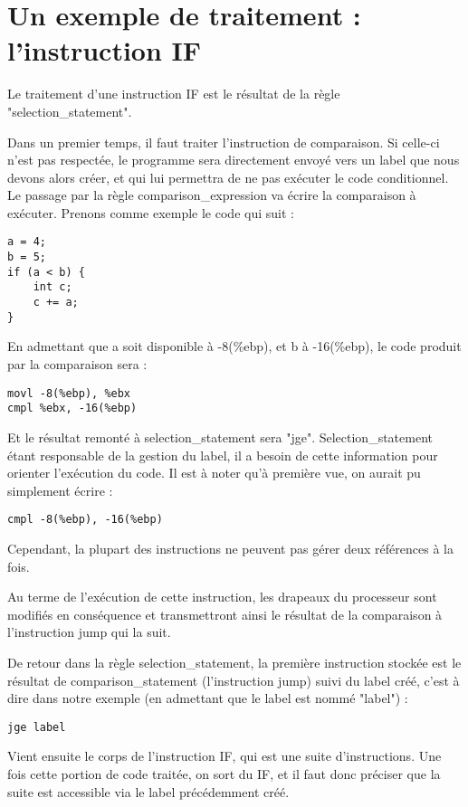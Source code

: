 \section{Un exemple de traitement : l'instruction IF} 

Le traitement d'une instruction IF est le résultat de la règle "selection\_statement".

Dans un premier temps, il faut traiter l'instruction de comparaison. Si celle-ci n'est pas respectée, le programme sera directement envoyé vers un label que nous devons alors créer, et qui lui permettra de ne pas exécuter le code conditionnel.
Le passage par la règle comparison\_expression va écrire la comparaison à exécuter.
Prenons comme exemple le code qui suit :
\begin{verbatim}
a = 4;
b = 5;
if (a < b) {
	int c;
	c += a;
}
\end{verbatim}

En admettant que a soit disponible à -8(\%ebp), et b à -16(\%ebp), le code produit par la comparaison sera :

\begin{verbatim}
movl -8(%ebp), %ebx
cmpl %ebx, -16(%ebp)
\end{verbatim}

Et le résultat remonté à selection\_statement sera "jge". 
Selection\_statement étant responsable de la gestion du label, il a besoin de cette information pour orienter l'exécution du code.
Il est à noter qu'à première vue, on aurait pu simplement écrire : \begin{verbatim}
cmpl -8(%ebp), -16(%ebp)
\end{verbatim}
Cependant, la plupart des instructions ne peuvent pas gérer deux références à la fois.

Au terme de l'exécution de cette instruction, les drapeaux du processeur sont modifiés en conséquence et transmettront ainsi le résultat de la comparaison à l'instruction jump qui la suit.

De retour dans la règle selection\_statement, la première instruction stockée est le résultat de comparison\_statement (l'instruction jump) suivi du label créé, c'est à dire dans notre exemple (en admettant que le label est nommé "label") : 
\begin{verbatim}
jge label
\end{verbatim}

Vient ensuite le corps de l'instruction IF, qui est une suite d'instructions.
Une fois cette portion de code traitée, on sort du IF, et il faut donc préciser que la suite est accessible via le label précédemment créé. 

